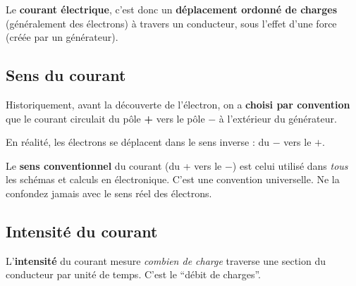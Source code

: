 \documentclass[12pt,a4paper,twoside]{book}
\begin{document}
Le \textbf{courant électrique}, c'est donc un \textbf{déplacement ordonné de charges} (généralement des électrons) à travers un conducteur, sous l'effet d'une force (créée par un générateur).

\subsection{Sens du courant}

Historiquement, avant la découverte de l'électron, on a \textbf{choisi par convention} que le courant circulait du pôle \textbf{+} vers le pôle \textbf{$-$} à l'extérieur du générateur.

En réalité, les électrons se déplacent dans le sens inverse : du $-$ vers le $+$.

\begin{attention}
Le \textbf{sens conventionnel} du courant (du + vers le $-$) est celui utilisé dans \textit{tous} les schémas et calculs en électronique. C'est une convention universelle. Ne la confondez jamais avec le sens réel des électrons.
\end{attention}

\begin{center}
\end{center}

\subsection{Intensité du courant}

L'\textbf{intensité} du courant mesure \textit{combien de charge} traverse une section du conducteur par unité de temps. C'est le ``débit de charges''.
\end{document}
